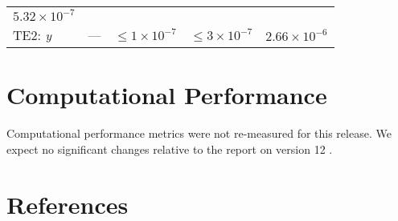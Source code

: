 \documentclass[DM,lsstdraft,toc]{lsstdoc}
\begin{document}
\begin{longtable}[]{@{}lllll@{}}
\begin{minipage}[t]{0.22\columnwidth}
\(5.32\times 10^{-7}\)\strut
\end{minipage}\tabularnewline
\begin{minipage}[t]{0.13\columnwidth}\raggedright\strut
TE2: \emph{y}\strut
\end{minipage} & \begin{minipage}[t]{0.05\columnwidth}\raggedright\strut
---\strut
\end{minipage} & \begin{minipage}[t]{0.24\columnwidth}\raggedright\strut
\(\leq 1\times 10^{-7}\)\strut
\end{minipage} & \begin{minipage}[t]{0.21\columnwidth}\raggedright\strut
\(\leq 3\times 10^{-7}\)\strut
\end{minipage} & \begin{minipage}[t]{0.22\columnwidth}\raggedright\strut
\(2.66\times 10^{-6}\)\strut
\end{minipage}\tabularnewline
\bottomrule
\end{longtable}

\section{Computational Performance}\label{computational-performance}

Computational performance metrics were not re-measured for this release.
We expect no significant changes relative to the
report on version 12 .

\appendix
\newpage
\section{References\label{sect:references}}
\renewcommand{\refname}{}


%
\end{document}
